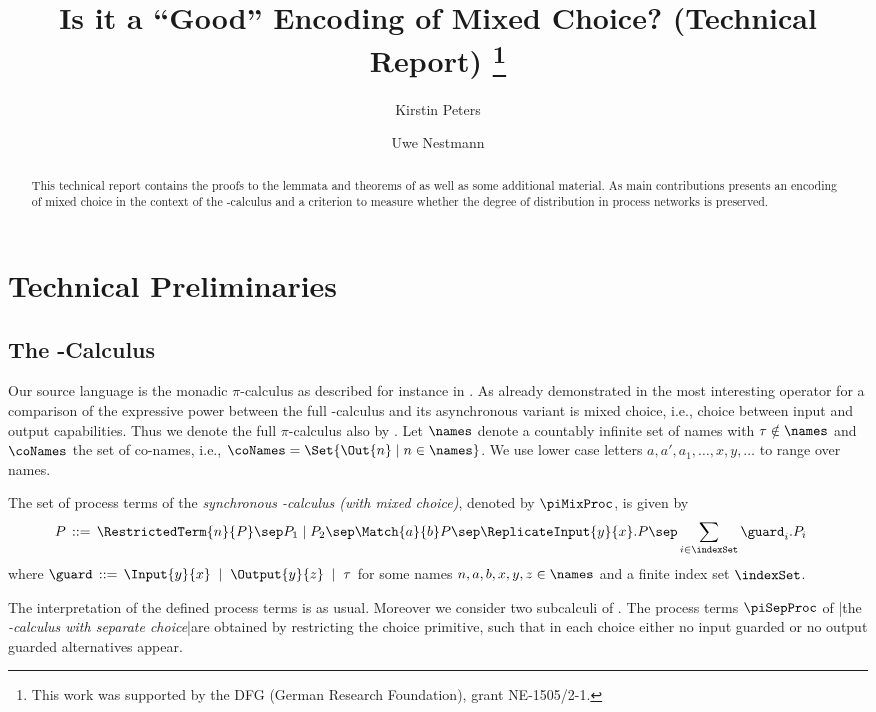 \documentclass[]{llncs}
\title{Is it a ``Good'' Encoding of Mixed Choice? (Technical Report) \thanks{This work was supported by the DFG (German Research Foundation), grant {NE-1505/2-1}.}}
\author{Kirstin Peters \and Uwe Nestmann}
\institute{TU Berlin, Germany}
\begin{document}
\maketitle

\begin{abstract}
	This technical report contains the proofs to the lemmata and theorems of \cite{petersNestmann12} as well as some additional material. As main contributions \cite{petersNestmann12} presents an encoding of mixed choice in the context of the \piCal-calculus and a criterion to measure whether the degree of distribution in process networks is preserved.
\end{abstract}

\section{Technical Preliminaries}
\label{sec:techPre}

\subsection{The \piCal-Calculus}
\label{sec:piCalculus}

Our source language is the monadic $ \pi $-calculus as described for instance in \cite{sangiorgiWalker01}. As already demonstrated in \cite{palamidessi03} the most interesting operator for a comparison of the expressive power between the full \piCal-calculus and its asynchronous variant is mixed choice, i.e., choice between input and output capabilities. Thus we denote the full $ \pi $-calculus also by \piMix. Let $ \names $ denote a countably infinite set of names with $ \tau \notin \names $ and $ \coNames $ the set of co-names, i.e., $ \coNames = \Set{ \Out{n} \mid n \in \names} $. We use lower case letters $ a, a', a_1, \ldots, x, y, \ldots $ to range over names.

\begin{definition}[\piMix]
\label{def:piMix}
  The set of process terms of the \emph{synchronous \piCal-calculus (with mixed choice)}, denoted by $ \piMixProc $, is given by
	\begin{align*}
		P & \;\mathop{::=}\;
                \RestrictedTerm{n}{P}
                \sep P_1 \mid P_2
                \sep \Match{a}{b}P
                \sep \ReplicateInput{y}{x}.P
                \sep \sum_{i \in \indexSet} \guard_i.P_i 
	\end{align*}
	where $ \guard \;\mathop{::=}\; \Input{y}{x} \; \mid \; \Output{y}{z} \; \mid \; \tau $ for some names $ n, a, b, x, y, z \in \names $ and a finite index set $ \indexSet $.
\end{definition}
\noindent
The interpretation of the defined process terms is as usual. Moreover we consider two subcalculi of \piMix. The process terms $ \piSepProc $ of \piSep|the \emph{\piCal-calculus with separate choice}|are obtained by restricting the choice primitive, such that in each choice either no input guarded or no output guarded alternatives appear.
\end{document}
